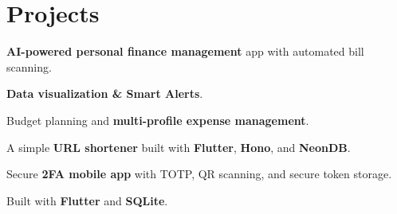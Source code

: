 \documentclass[]{deedy-resume-reversed}
\begin{document}
\begin{minipage}[t]{0.60\textwidth}
\section{Projects}

\begin{tightemize}
\item \textbf{AI-powered personal finance management} app with automated bill scanning.
\item \textbf{Data visualization \& Smart Alerts}.
\item Budget planning and \textbf{multi-profile expense management}.
\end{tightemize}
\sectionsep

\begin{tightemize}
\item A simple \textbf{URL shortener} built with \textbf{Flutter}, \textbf{Hono}, and \textbf{NeonDB}.
\end{tightemize}
\sectionsep

\begin{tightemize}
\item Secure \textbf{2FA mobile app} with TOTP, QR scanning, and secure token storage.
\item Built with \textbf{Flutter} and \textbf{SQLite}.
\end{tightemize}
\sectionsep

\end{minipage}
\hfill
\end{document}
